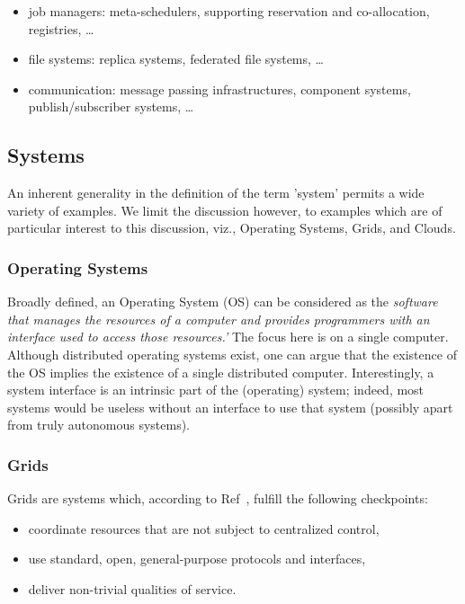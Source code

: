 \documentclass[conference,final]{IEEEtran}
\newcommand{\I}[1]{\textit{#1}}
\begin{document}
   \begin{itemize}
     \item job managers: meta-schedulers, supporting 
           reservation and co-allocation, registries, \dots
     \item file systems: replica systems, federated file systems, 
           \dots
     \item communication: message passing infrastructures, 
           component systems, publish/subscriber systems, \dots
   \end{itemize}


 \subsection{Systems}

  An inherent generality in the definition of the term 'system'
  permits a wide variety of examples.  We limit the discussion
  however, to examples which are of particular interest to this
  discussion, viz., Operating Systems, Grids, and Clouds.

  \subsubsection{Operating Systems}

   Broadly defined\cite{wikipedia}, an Operating System (OS) can be
   considered as the \I{software that manages the resources of a
   computer and provides programmers with an interface used to access
   those resources.'}  The focus here is on a single computer.
   Although distributed operating systems exist, one can argue that
   the existence of the OS implies the existence of a single
   distributed computer.  Interestingly, a system interface is an
   intrinsic part of the (operating) system; indeed, most systems
   would be useless without an interface to use that system (possibly
   apart from truly autonomous systems). 

  \subsubsection{Grids}

   Grids are systems which, according to Ref~\cite{foster}, fulfill
   the following checkpoints:

   \begin{itemize}
     \item coordinate resources that are not subject to centralized
           control,
     \item use standard, open, general-purpose protocols and interfaces,
     \item deliver non-trivial qualities of service.
   \end{itemize}
\end{document}
